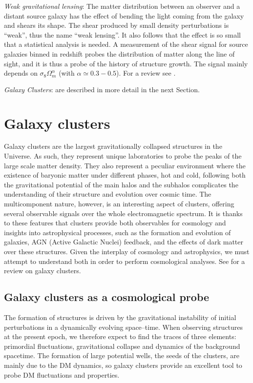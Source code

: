 \emph{Weak gravitational lensing}: The matter distribution between an observer and a distant source galaxy has the effect of bending the light coming from the galaxy and shears its shape. The shear produced by small density perturbations is ``weak'', thus the name ``weak lensing''. It also follows that the effect is so small that a statistical analysis is needed. A measurement of the shear signal for source galaxies binned in redshift probes the distribution of matter along the line of sight, and it is thus a probe of the history of structure growth. The signal mainly depends on $\sigma_8\Omega_m^\alpha$ (with $\alpha\simeq 0.3-0.5$). For a review see \citet{Hoekstra}.

\emph{Galaxy Clusters}: are described in more detail in the next Section.

\section{Galaxy clusters}\label{sec:clusters}

Galaxy clusters are the largest gravitationally collapsed structures in the Universe. As such, they represent unique laboratories to probe the peaks of the large scale matter density. They also represent a peculiar environment where the existence of baryonic matter under different phases, hot and cold, following both the gravitational potential of the main halos and the subhalos complicates the understanding of their structure and evolution over cosmic time. The multicomponent nature, however, is an interesting aspect of clusters, offering several observable signals over the whole electromagnetic spectrum. It is thanks to these features that clusters provide both observables for cosmology and insights into astrophysical processes, such as the formation and evolution of galaxies, AGN (Active Galactic Nuclei) feedback, and the effects of dark matter over these structures. Given the interplay of cosmology and astrophysics, we must attempt to understand both in order to perform cosmological analyses. See \citealt{biviano} for a review on galaxy clusters.

\subsection{Galaxy clusters as a cosmological probe}
The formation of structures is driven by the gravitational instability of initial perturbations in a dynamically evolving space--time. When observing structures at the present epoch, we therefore expect to find the traces of three elements: primordial fluctuations, gravitational collapse and dynamics of the background spacetime. %
The formation of large potential wells, the seeds of the clusters, are mainly due to the DM dynamics, so galaxy clusters provide an excellent tool to probe DM fluctuations and properties.

